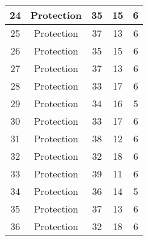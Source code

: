 \documentclass[results.tex]{subfiles}
\begin{document}
\begin{center}
\begin{tabular}{| c || c | c | c | c |}
            \hline
            24                      & Protection                   & 35                     & 15                      & 6                    \\
            \hline
            25                      & Protection                   & 37                     & 13                      & 6                    \\
            \hline
            26                      & Protection                   & 35                     & 15                      & 6                    \\
            \hline
            27                      & Protection                   & 37                     & 13                      & 6                    \\
            \hline
            28                      & Protection                   & 33                     & 17                      & 6                    \\
            \hline
            29                      & Protection                   & 34                     & 16                      & 5                    \\
            \hline
            30                      & Protection                   & 33                     & 17                      & 6                    \\
            \hline
            31                      & Protection                   & 38                     & 12                      & 6                    \\
            \hline
            32                      & Protection                   & 32                     & 18                      & 6                    \\
            \hline
            33                      & Protection                   & 39                     & 11                      & 6                    \\
            \hline
            34                      & Protection                   & 36                     & 14                      & 5                    \\
            \hline
            35                      & Protection                   & 37                     & 13                      & 6                    \\
            \hline
            36                      & Protection                   & 32                     & 18                      & 6                    \\

\end{tabular}
\end{center}
\end{document}
